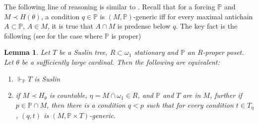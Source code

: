 \documentclass[a4paper,11pt]{article}
\newtheorem{lemma}[theorem]{Lemma}
\newcommand{\forceP}{\mathbb{P}}
\begin{document}
The following  line of reasoning is similar to \cite{Ho}.
Recall that for a forcing $\forceP$ and $M \prec H(\theta)$, a condition $q \in \forceP$ is $(M,\forceP)$-generic iff for every maximal antichain $A \subset \forceP$, $A \in M$, it is true that $ A \cap M$ is predense below $q$.
The key fact is the following (see \cite{Miyamoto2} for the case where $\forceP$ is proper)
\begin{lemma}\label{preservation of Suslin trees}
 Let $T$ be a Suslin tree, $R \subset \omega_1$ stationary and $\forceP$ an $R$-proper
 poset. Let $\theta$ be a sufficiently large cardinal.
 Then the following are equivalent:
 \begin{enumerate}
  \item $\Vdash_{\forceP} T$ is Suslin
 
  \item if $M \prec H_{\theta}$ is countable, $\eta = M \cap \omega_1 \in R$, and $\forceP$ and $T$ are in $M$,
  further if $p \in \forceP \cap M$, then there is a condition $q<p$ such that 
  for every condition $t \in T_{\eta}$, 
  $(q,t)$ is $(M, \forceP \times T)$-generic.
 \end{enumerate}

\end{lemma}
\end{document}

